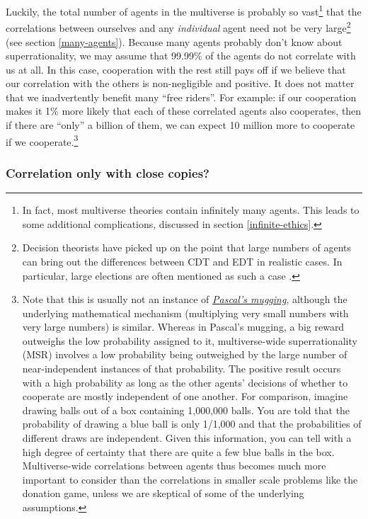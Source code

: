 Luckily, the total number of agents in the multiverse is probably so
vast\footnote{In fact, most multiverse theories contain infinitely many
  agents. This leads to some additional complications, discussed in
  section \ref{infinite-ethics}.} that the correlations between ourselves and any
\emph{individual} agent need not be very large\footnote{Decision
  theorists have picked up on the point that large numbers of agents can
  bring out the differences between CDT and EDT in realistic cases. In
  particular, large elections are often mentioned as such a case
  \parencite{Ahmed2014-ec}.} (see section
\ref{many-agents}). Because many
agents probably don't know about superrationality, we may assume that
99.99\% of the agents do not correlate with us at all. In this case,
cooperation with the rest still pays off if we believe that our
correlation with the others is non-negligible and positive. It does not
matter that we inadvertently benefit many ``free riders''. For example:
if our cooperation makes it 1\% more likely that each of these
correlated agents also cooperates, then if there are ``only'' a billion
of them, we can expect 10 million more to cooperate if we
cooperate.\footnote{Note that this is usually not an instance of
  \href{https://wiki.lesswrong.com/wiki/Pascal\%27s_mugging}{\emph{Pascal's
  mugging}}, although the underlying mathematical mechanism (multiplying
  very small numbers with very large numbers) is similar. Whereas in
  Pascal's mugging, a big reward outweighs the low probability assigned
  to it, multiverse-wide superrationality (MSR) involves a low
  probability being outweighed by the large number of near-independent
  instances of that probability. The positive result occurs with a high
  probability as long as the other agents' decisions of whether to
  cooperate are mostly independent of one another. For comparison,
  imagine drawing balls out of a box containing 1,000,000 balls. You are
  told that the probability of drawing a blue ball is only 1/1,000 and
  that the probabilities of different draws are independent. Given this
  information, you can tell with a high degree of certainty that there
  are quite a few blue balls in the box. Multiverse-wide correlations
  between agents thus becomes much more important to consider than the
  correlations in smaller scale problems like the donation game, unless
  we are skeptical of some of the underlying assumptions.}

\subsubsection{Correlation only with close
copies?}\label{correlation-only-with-close-copies}

